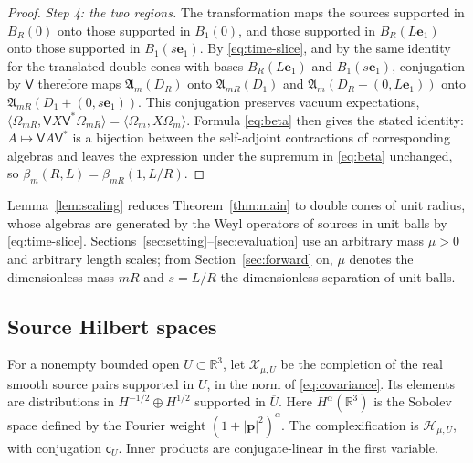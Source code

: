 \documentclass[11pt]{amsart}
\numberwithin{equation}{section}
\theoremstyle{definition}
\newcommand{\A}{\mathfrak A}
\newcommand{\R}{\mathbb R}
\newcommand{\Hh}{\mathcal H}
\newcommand{\bp}{\mathbf p}
\newcommand{\eone}{\mathbf e_1}
\newcommand{\ip}[2]{\langle #1,#2\rangle}
\begin{document}
\begin{proof}
\smallskip
\emph{Step 4: the two regions.} The transformation maps the sources
supported in \(B_R(0)\) onto those supported in \(B_1(0)\), and those
supported in \(B_R(L\eone)\) onto those supported in \(B_1(s\eone)\).
By \eqref{eq:time-slice}, and by the same identity for the translated
double cones with bases \(B_R(L\eone)\) and \(B_1(s\eone)\), conjugation
by \(\mathsf V\) therefore maps \(\A_m(D_R)\) onto \(\A_{mR}(D_1)\) and
\(\A_m(D_R+(0,L\eone))\) onto \(\A_{mR}(D_1+(0,s\eone))\). This conjugation preserves
vacuum expectations,
\(\ip{\Omega_{mR}}{\mathsf VX\mathsf V^*\Omega_{mR}}=\ip{\Omega_m}{X\Omega_m}\).
Formula \eqref{eq:beta} then gives the stated identity:
\(A\mapsto\mathsf VA\mathsf V^*\) is a
bijection between the self-adjoint contractions of corresponding
algebras and leaves the expression under the supremum in
\eqref{eq:beta} unchanged, so \(\beta_m(R,L)=\beta_{mR}(1,L/R)\).
\end{proof}

Lemma~\ref{lem:scaling} reduces Theorem~\ref{thm:main} to double cones
of unit radius, whose algebras are generated by the Weyl operators of
sources in unit balls by \eqref{eq:time-slice}. Sections~\ref{sec:setting}--\ref{sec:evaluation} use an
arbitrary mass \(\mu>0\) and arbitrary length scales; from
Section~\ref{sec:forward} on, \(\mu\) denotes the dimensionless mass
\(mR\) and \(s=L/R\) the dimensionless separation of unit balls.

\subsection{Source Hilbert spaces}\label{subsec:sources}

For a nonempty bounded open \(U\subset\R^3\), let
\(\mathcal X_{\mu,U}\) be the completion of the real smooth source pairs
supported in \(U\), in the norm of \eqref{eq:covariance}. Its elements
are distributions in \(H^{-1/2}\oplus H^{1/2}\) supported in \(\overline U\). Here
\(H^\alpha(\R^3)\) is the Sobolev space defined by the Fourier weight
\((1+|\bp|^2)^\alpha\).
The complexification is \(\Hh_{\mu,U}\), with conjugation
\(\mathsf c_U\). Inner products are conjugate-linear in the first
variable.
\end{document}
